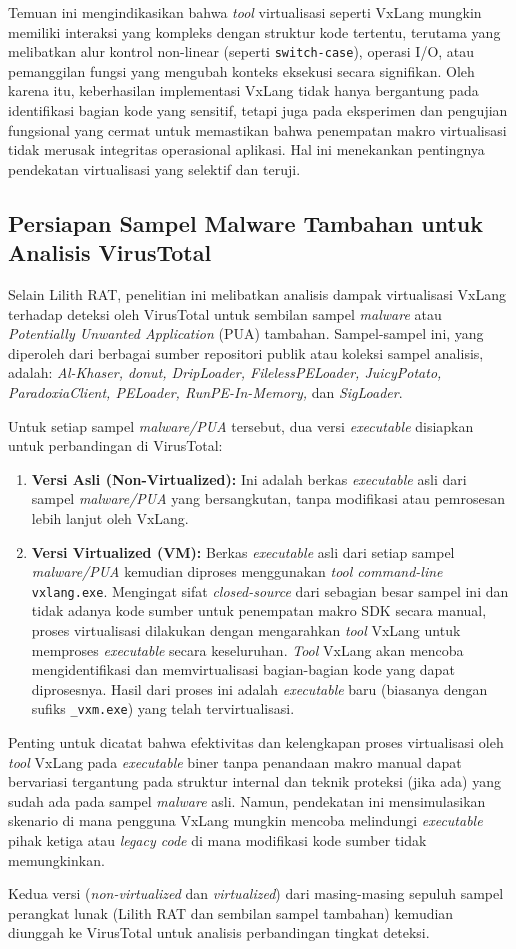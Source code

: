 Temuan ini mengindikasikan bahwa \textit{tool} virtualisasi seperti VxLang mungkin memiliki interaksi yang kompleks dengan struktur kode tertentu, terutama yang melibatkan alur kontrol non-linear (seperti \texttt{switch-case}), operasi I/O, atau pemanggilan fungsi yang mengubah konteks eksekusi secara signifikan. Oleh karena itu, keberhasilan implementasi VxLang tidak hanya bergantung pada identifikasi bagian kode yang sensitif, tetapi juga pada eksperimen dan pengujian fungsional yang cermat untuk memastikan bahwa penempatan makro virtualisasi tidak merusak integritas operasional aplikasi. Hal ini menekankan pentingnya pendekatan virtualisasi yang selektif dan teruji.

\subsection{Persiapan Sampel Malware Tambahan untuk Analisis VirusTotal}
\label{subsec:persiapan_malware_tambahan}
Selain Lilith RAT, penelitian ini melibatkan analisis dampak virtualisasi VxLang terhadap deteksi oleh VirusTotal untuk sembilan sampel \textit{malware} atau \textit{Potentially Unwanted Application} (PUA) tambahan. Sampel-sampel ini, yang diperoleh dari berbagai sumber repositori publik atau koleksi sampel analisis, adalah: \textit{Al-Khaser, donut, DripLoader, FilelessPELoader, JuicyPotato, ParadoxiaClient, PELoader, RunPE-In-Memory,} dan \textit{SigLoader}.

Untuk setiap sampel \textit{malware/PUA} tersebut, dua versi \textit{executable} disiapkan untuk perbandingan di VirusTotal:
\begin{enumerate}
    \item \textbf{Versi Asli (Non-Virtualized):} Ini adalah berkas \textit{executable} asli dari sampel \textit{malware/PUA} yang bersangkutan, tanpa modifikasi atau pemrosesan lebih lanjut oleh VxLang.
    \item \textbf{Versi Virtualized (VM):} Berkas \textit{executable} asli dari setiap sampel \textit{malware/PUA} kemudian diproses menggunakan \textit{tool command-line} \texttt{vxlang.exe}. Mengingat sifat \textit{closed-source} dari sebagian besar sampel ini dan tidak adanya kode sumber untuk penempatan makro SDK secara manual, proses virtualisasi dilakukan dengan mengarahkan \textit{tool} VxLang untuk memproses \textit{executable} secara keseluruhan. \textit{Tool} VxLang akan mencoba mengidentifikasi dan memvirtualisasi bagian-bagian kode yang dapat diprosesnya. Hasil dari proses ini adalah \textit{executable} baru (biasanya dengan sufiks \texttt{\_vxm.exe}) yang telah tervirtualisasi.
\end{enumerate}
Penting untuk dicatat bahwa efektivitas dan kelengkapan proses virtualisasi oleh \textit{tool} VxLang pada \textit{executable} biner tanpa penandaan makro manual dapat bervariasi tergantung pada struktur internal dan teknik proteksi (jika ada) yang sudah ada pada sampel \textit{malware} asli. Namun, pendekatan ini mensimulasikan skenario di mana pengguna VxLang mungkin mencoba melindungi \textit{executable} pihak ketiga atau \textit{legacy code} di mana modifikasi kode sumber tidak memungkinkan.

Kedua versi (\textit{non-virtualized} dan \textit{virtualized}) dari masing-masing sepuluh sampel perangkat lunak (Lilith RAT dan sembilan sampel tambahan) kemudian diunggah ke VirusTotal untuk analisis perbandingan tingkat deteksi.
